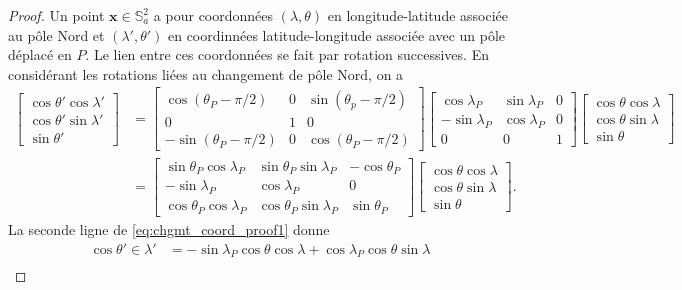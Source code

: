 \begin{proof}
Un point $\mathbf{x} \in \mathbb{S}_a^2$ a pour coordonnées $(\lambda, \theta)$ en longitude-latitude associée au pôle Nord et $(\lambda', \theta')$ en coordinnées latitude-longitude associée avec un pôle déplacé en $P$. Le lien entre ces coordonnées se fait par rotation successives.
En considérant les rotations liées au changement de pôle Nord, on a
\begin{align}
\begin{bmatrix}
\cos \theta' \cos \lambda' \\ \cos \theta' \sin \lambda' \\ \sin \theta'
\end{bmatrix} & = 
\begin{bmatrix}
\cos (\theta_P - \pi/2) & 0 & \sin (\theta_p - \pi/2) \\
0 & 1 & 0 \\
- \sin (\theta_P - \pi/2 ) & 0 & \cos (\theta_P - \pi/2)
\end{bmatrix}
\begin{bmatrix}
\cos \lambda_P & \sin \lambda_P & 0 \\
- \sin \lambda_P & \cos \lambda_P & 0 \\
0 & 0 & 1 
\end{bmatrix}
\begin{bmatrix}
\cos \theta \cos \lambda \\ \cos \theta \sin \lambda \\ \sin \theta
\end{bmatrix} \\
& = \begin{bmatrix}
\sin \theta_P \cos \lambda_P & \sin \theta_P \sin \lambda_P & - \cos \theta_P \\
- \sin \lambda_P & \cos \lambda_P & 0 \\
\cos \theta_P \cos \lambda_P & \cos \theta_P \sin \lambda_P & \sin \theta_P
\end{bmatrix}
\begin{bmatrix}
\cos \theta \cos \lambda \\ \cos \theta \sin \lambda \\ \sin \theta
\end{bmatrix}.
\label{eq:chgmt_coord_proof1}
\end{align}
La seconde ligne de \eqref{eq:chgmt_coord_proof1} donne
\begin{align*}
\cos \theta' \in \lambda'  & = - \sin \lambda_P \cos \theta \cos \lambda + \cos \lambda_P \cos \theta \sin \lambda \\

\end{align*}
\end{proof}
